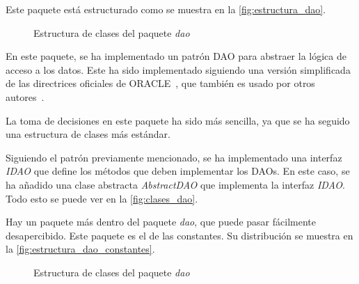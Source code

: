 Este paquete está estructurado como se muestra en la \autoref{fig:estructura_dao}.

\begin{figure}[h]
    \centering
    \caption{Estructura de clases del paquete \textit{dao}}
    \label{fig:estructura_dao}
\end{figure}


En este paquete, se ha implementado un patrón DAO para abstraer la lógica de acceso a los datos.
Este ha sido implementado siguiendo una versión simplificada de las directrices oficiales de ORACLE~\autocite
{oracle.dao},
que también es usado por otros autores~\autocite{baeldung.dao}.

La toma de decisiones en este paquete ha sido más sencilla,
ya que se ha seguido una estructura de clases más estándar.

Siguiendo el patrón previamente mencionado, se ha implementado una interfaz \textit{IDAO} que define los métodos que deben implementar los DAOs.
En este caso, se ha añadido una clase abstracta \textit{AbstractDAO} que implementa la interfaz \textit{IDAO}.
Todo esto se puede ver en la \autoref{fig:clases_dao}.

Hay un paquete más dentro del paquete \textit{dao}, que puede pasar fácilmente desapercibido.
Este paquete es el de las constantes.
Su distribución se muestra en la \autoref{fig:estructura_dao_constantes}.

\begin{figure}[h]
    \centering
    \caption{Estructura de clases del paquete \textit{dao}}
    \label{fig:estructura_dao_constantes}
\end{figure}

